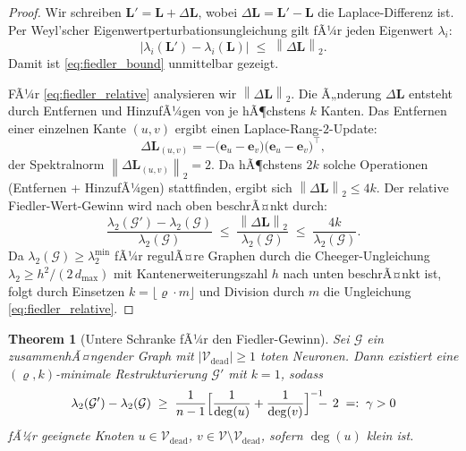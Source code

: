 ﻿\documentclass[12pt, a4paper, openany]{report}
\newtheorem{theorem}{Theorem}[chapter]
\newcommand{\calG}{\mathcal{G}}
\newcommand{\calV}{\mathcal{V}}
\newcommand{\norms}[1]{\left\|#1\right\|}
\newcommand{\abs}[1]{\left|#1\right|}
\begin{document}
\begin{proof}
Wir schreiben $\bm{L}' = \bm{L} + \Delta\bm{L}$, wobei $\Delta\bm{L} =
\bm{L}' - \bm{L}$ die Laplace-Differenz ist.  Per Weyl'scher
Eigenwertperturbationsungleichung gilt fÃ¼r jeden Eigenwert $\lambda_i$:
\begin{equation}
  \label{eq:weyl}
  \abs{\lambda_i(\bm{L}') - \lambda_i(\bm{L})} \;\leq\; \norms{\Delta\bm{L}}_2.
\end{equation}
Damit ist \eqref{eq:fiedler_bound} unmittelbar gezeigt.

FÃ¼r \eqref{eq:fiedler_relative} analysieren wir $\norms{\Delta\bm{L}}_2$.
Die Ã„nderung $\Delta\bm{L}$ entsteht durch Entfernen und HinzufÃ¼gen von
je hÃ¶chstens $k$ Kanten.  Das Entfernen einer einzelnen Kante
$(u,v)$ ergibt einen Laplace-Rang-$2$-Update:
\[
  \Delta\bm{L}_{(u,v)}
  = -\bigl(\bm{e}_u - \bm{e}_v\bigr)\bigl(\bm{e}_u - \bm{e}_v\bigr)^\top,
\]
der Spektralnorm $\norms{\Delta\bm{L}_{(u,v)}}_2 = 2$.  Da hÃ¶chstens
$2k$ solche Operationen (Entfernen + HinzufÃ¼gen) stattfinden, ergibt
sich $\norms{\Delta\bm{L}}_2 \leq 4k$.  Der relative Fiedler-Wert-Gewinn
wird nach oben beschrÃ¤nkt durch:
\[
  \frac{\lambda_2(\calG') - \lambda_2(\calG)}{\lambda_2(\calG)}
  \;\leq\;
  \frac{\norms{\Delta\bm{L}}_2}{\lambda_2(\calG)}
  \;\leq\;
  \frac{4k}{\lambda_2(\calG)}.
\]
Da $\lambda_2(\calG) \geq \lambda_2^{\min}$ fÃ¼r regulÃ¤re Graphen durch
die Cheeger-Ungleichung $\lambda_2 \geq h^2/(2\,d_{\max})$ mit
Kantenerweiterungszahl $h$ nach unten beschrÃ¤nkt ist, folgt durch
Einsetzen $k = \lfloor\varrho\cdot m\rfloor$ und Division durch $m$
die Ungleichung \eqref{eq:fiedler_relative}.
\end{proof}

\begin{theorem}[Untere Schranke fÃ¼r den Fiedler-Gewinn]
\label{thm:fiedler_lower}
Sei $\calG$ ein zusammenhÃ¤ngender Graph mit $|\calV_{\mathrm{dead}}| \geq 1$
toten Neuronen.  Dann existiert eine $(\varrho, k)$-minimale Restrukturierung
$\calG'$ mit $k = 1$, sodass
\begin{equation}
  \label{eq:fiedler_lower}
  \lambda_2(\calG') - \lambda_2(\calG)
  \;\geq\;
  \frac{1}{n-1}
  \Bigl[
    \frac{1}{\deg(u)} + \frac{1}{\deg(v)}
  \Bigr]^{-1} \!\!\!\!- \,2
  \;=:\; \gamma > 0
\end{equation}
fÃ¼r geeignete Knoten $u \in \calV_{\mathrm{dead}}$, $v \in \calV \setminus \calV_{\mathrm{dead}}$,
sofern $\deg(u)$ klein ist.
\end{theorem}
\end{document}
